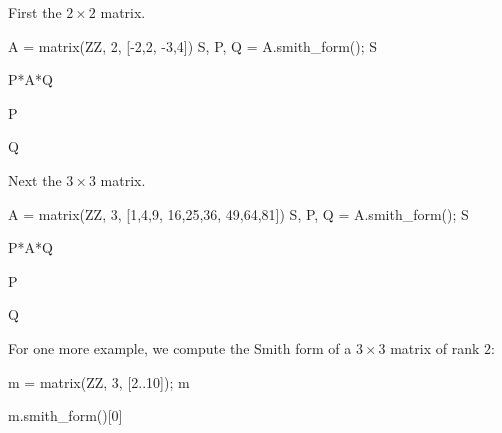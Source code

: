 \begin{example}
First the $2 \times 2$ matrix.
\begin{sagecode}
\begin{sagecell}
A = matrix(ZZ, 2, [-2,2, -3,4])
S, P, Q = A.smith_form(); S
\end{sagecell}
\begin{sageout}
[1 0]
[0 2]
\end{sageout}
\begin{sagecell}
P*A*Q
\end{sagecell}
\begin{sageout}
[1 0]
[0 2]
\end{sageout}
\begin{sagecell}
P
\end{sagecell}
\begin{sageout}
[0 1]
[1 0]
\end{sageout}
\begin{sagecell}
Q
\end{sagecell}
\begin{sageout}
[1 -4]
[1 -3]
\end{sageout}
\end{sagecode}
Next the $3\times3$ matrix.
\begin{sagecode}
\begin{sagecell}
A = matrix(ZZ, 3, [1,4,9, 16,25,36, 49,64,81])
S, P, Q = A.smith_form(); S
\end{sagecell}
\begin{sageout}
[ 1  0  0]
[ 0  3  0]
[ 0  0 72]
\end{sageout}
\begin{sagecell}
P*A*Q
\end{sagecell}
\begin{sageout}
[ 1  0  0]
[ 0  3  0]
[ 0  0 72]
\end{sageout}
\begin{sagecell}
P
\end{sagecell}
\begin{sageout}
[  0   0   1]
[  0   1  -1]
[  1 -20 -17]
\end{sageout}
\begin{sagecell}
Q
\end{sagecell}
\begin{sageout}
[  47   74   93]
[ -79 -125 -156]
[  34   54   67]
\end{sageout}
\end{sagecode}

For one more example, we compute the Smith form of a
$3\times 3$ matrix of rank $2$:
\begin{sagecode}
\begin{sagecell}
m = matrix(ZZ, 3, [2..10]); m
\end{sagecell}
\begin{sageout}
[ 2  3  4]
[ 5  6  7]
[ 8  9 10]
\end{sageout}
\begin{sagecell}
m.smith_form()[0]
\end{sagecell}
\begin{sageout}
[1 0 0]
[0 3 0]
[0 0 0]
\end{sageout}
\end{sagecode}
\end{example}


